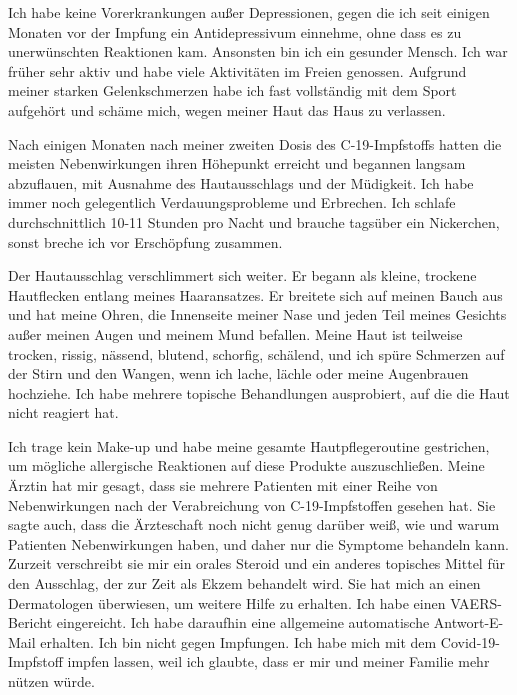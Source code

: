 Ich habe keine Vorerkrankungen außer Depressionen, gegen die ich seit einigen
Monaten vor der Impfung ein Antidepressivum einnehme, ohne dass es zu
unerwünschten Reaktionen kam. Ansonsten bin ich ein gesunder Mensch. Ich war
früher sehr aktiv und habe viele Aktivitäten im Freien genossen. Aufgrund meiner
starken Gelenkschmerzen habe ich fast vollständig mit dem Sport aufgehört und
schäme mich, wegen meiner Haut das Haus zu verlassen.

Nach einigen Monaten nach meiner zweiten Dosis des C-19-Impfstoffs hatten die
meisten Nebenwirkungen ihren Höhepunkt erreicht und begannen langsam abzuflauen,
mit Ausnahme des Hautausschlags und der Müdigkeit. Ich habe immer noch
gelegentlich Verdauungsprobleme und Erbrechen. Ich schlafe durchschnittlich
10-11 Stunden pro Nacht und brauche tagsüber ein Nickerchen, sonst breche ich
vor Erschöpfung zusammen.

Der Hautausschlag verschlimmert sich weiter. Er begann als kleine, trockene
Hautflecken entlang meines Haaransatzes. Er breitete sich auf meinen Bauch aus
und hat meine Ohren, die Innenseite meiner Nase und jeden Teil meines Gesichts
außer meinen Augen und meinem Mund befallen. Meine Haut ist teilweise trocken,
rissig, nässend, blutend, schorfig, schälend, und ich spüre Schmerzen auf der
Stirn und den Wangen, wenn ich lache, lächle oder meine Augenbrauen
hochziehe. Ich habe mehrere topische Behandlungen ausprobiert, auf die die Haut
nicht reagiert hat.

Ich trage kein Make-up und habe meine gesamte Hautpflegeroutine gestrichen, um
mögliche allergische Reaktionen auf diese Produkte auszuschließen. Meine Ärztin
hat mir gesagt, dass sie mehrere Patienten mit einer Reihe von Nebenwirkungen
nach der Verabreichung von C-19-Impfstoffen gesehen hat. Sie sagte auch, dass
die Ärzteschaft noch nicht genug darüber weiß, wie und warum Patienten
Nebenwirkungen haben, und daher nur die Symptome behandeln kann. Zurzeit
verschreibt sie mir ein orales Steroid und ein anderes topisches Mittel für den
Ausschlag, der zur Zeit als Ekzem behandelt wird. Sie hat mich an einen
Dermatologen überwiesen, um weitere Hilfe zu erhalten. Ich habe einen
VAERS-Bericht eingereicht. Ich habe daraufhin eine allgemeine automatische
Antwort-E-Mail erhalten. Ich bin nicht gegen Impfungen. Ich habe mich mit dem
Covid-19-Impfstoff impfen lassen, weil ich glaubte, dass er mir und meiner
Familie mehr nützen würde.

